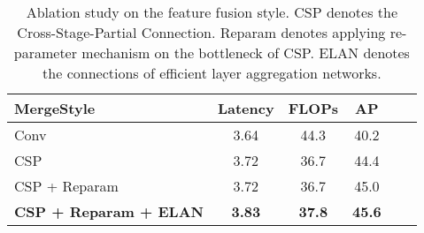 \documentclass[10pt,twocolumn,letterpaper]{article}
\begin{document}
\begin{table}
    \begin{center}
    \caption{Ablation study on the feature fusion style. CSP denotes the Cross-Stage-Partial Connection. Reparam \cite{ding2022re,ding2021repvgg} denotes applying re-parameter mechanism on the bottleneck of CSP. ELAN denotes the connections of efficient layer aggregation networks.}
    \label{tab:fusion}
    \setlength{\tabcolsep}{3pt}
    \begin{tabular}{l|ccccc}
    \toprule
    MergeStyle & Latency & FLOPs & AP    \\
    \midrule 
    Conv                      & 3.64 & 44.3 & 40.2  \\
    CSP                       & 3.72 & 36.7 & 44.4 \\
    CSP + Reparam            & 3.72 & 36.7 & 45.0 \\
    \textbf{CSP + Reparam + ELAN}  & \textbf{3.83} & \textbf{37.8} & \textbf{45.6} \\
    \bottomrule
    \end{tabular}
    \end{center}
\end{table}
\end{document}
